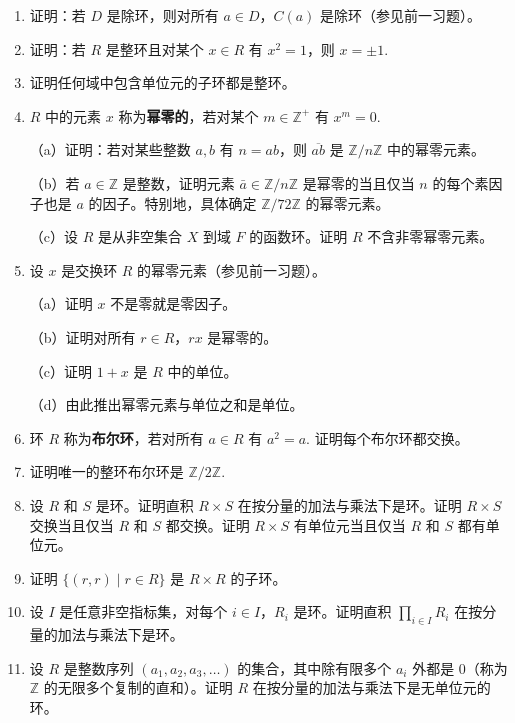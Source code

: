 \begin{enumerate}
\item 证明：若 \(D\) 是除环，则对所有 \(a \in D\)，\(C(a)\) 是除环（参见前一习题）。

\item 证明：若 \(R\) 是整环且对某个 \(x \in R\) 有 \(x^2 = 1\)，则 \(x = \pm 1\).

\item 证明任何域中包含单位元的子环都是整环。

\item \(R\) 中的元素 \(x\) 称为\textbf{幂零的}，若对某个 \(m \in \mathbb{Z}^+\) 有 \(x^m = 0\).

（a）证明：若对某些整数 \(a, b\) 有 \(n = ab\)，则 \(\overline{ab}\) 是 \(\mathbb{Z}/n\mathbb{Z}\) 中的幂零元素。

（b）若 \(a \in \mathbb{Z}\) 是整数，证明元素 \(\bar{a} \in \mathbb{Z}/n\mathbb{Z}\) 是幂零的当且仅当 \(n\) 的每个素因子也是 \(a\) 的因子。特别地，具体确定 \(\mathbb{Z}/72\mathbb{Z}\) 的幂零元素。

（c）设 \(R\) 是从非空集合 \(X\) 到域 \(F\) 的函数环。证明 \(R\) 不含非零幂零元素。

\item 设 \(x\) 是交换环 \(R\) 的幂零元素（参见前一习题）。

（a）证明 \(x\) 不是零就是零因子。

（b）证明对所有 \(r \in R\)，\(rx\) 是幂零的。

（c）证明 \(1 + x\) 是 \(R\) 中的单位。

（d）由此推出幂零元素与单位之和是单位。

\item 环 \(R\) 称为\textbf{布尔环}，若对所有 \(a \in R\) 有 \(a^2 = a\). 证明每个布尔环都交换。

\item 证明唯一的整环布尔环是 \(\mathbb{Z}/2\mathbb{Z}\).

\item 设 \(R\) 和 \(S\) 是环。证明直积 \(R \times S\) 在按分量的加法与乘法下是环。证明 \(R \times S\) 交换当且仅当 \(R\) 和 \(S\) 都交换。证明 \(R \times S\) 有单位元当且仅当 \(R\) 和 \(S\) 都有单位元。

\item 证明 \(\{(r, r) \mid r \in R\}\) 是 \(R \times R\) 的子环。

\item 设 \(I\) 是任意非空指标集，对每个 \(i \in I\)，\(R_i\) 是环。证明直积 \(\prod_{i \in I} R_i\) 在按分量的加法与乘法下是环。

\item 设 \(R\) 是整数序列 \((a_1, a_2, a_3, \ldots)\) 的集合，其中除有限多个 \(a_i\) 外都是 0（称为 \(\mathbb{Z}\) 的无限多个复制的直和）。证明 \(R\) 在按分量的加法与乘法下是无单位元的环。


\end{enumerate}
